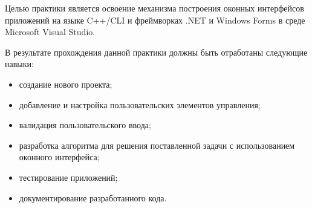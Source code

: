 \documentclass[pract]{SCWorks}
\begin{document}







\date{2024}

\maketitle

\secNumbering

\tableofcontents




\intro
Целью практики является освоение механизма построения оконных интерфейсов приложений на языке C++/CLI и фреймворках .NET и Windows Forms в среде Microsoft Visual Studio\cite{docs-vs-cpp-cli}.

В результате прохождения данной практики должны быть отработаны следующие навыки:

\begin{itemize}
    \item создание нового проекта;
    \item добавление и настройка пользовательских элементов управления;
    \item валидация пользовательского ввода;
    \item разработка алгоритма для решения поставленной задачи с использованием оконного интерфейса;
    \item тестирование приложений;
    \item документирование разработанного кода.
\end{itemize}
\end{document}
